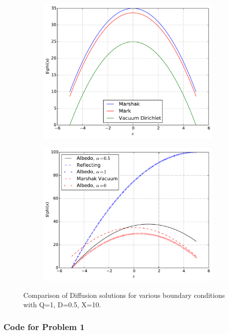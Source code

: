 \documentclass[12pt]{article}
\begin{document}
    \begin{figure}[h!]
        \centering
        \begin{subfigure}{0.495\textwidth}
            \centering 
            \includegraphics[width=0.99\textwidth]{diff_soln1.pdf}
        \end{subfigure}
        \begin{subfigure}{0.495\textwidth}
            \centering 
            \includegraphics[width=0.99\textwidth]{diff_soln2.pdf}
        \end{subfigure}
        \caption{Comparison of Diffusion solutions for various boundary conditions
        with Q=1, D=0.5, X=10.}
    \end{figure}
\clearpage
\subsubsection*{Code for Problem 1}

\end{document}
